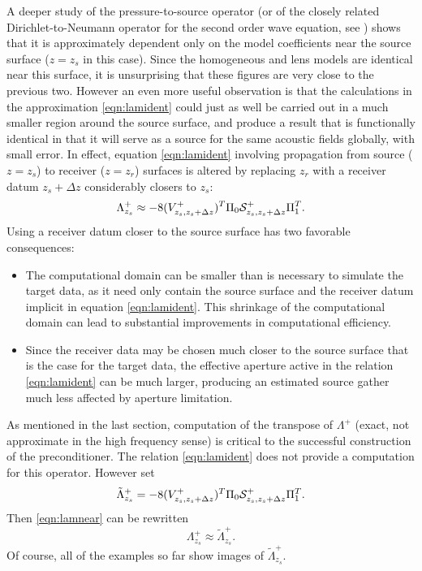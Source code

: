 \documentclass[georeport,12pt]{geophysics}
\begin{document}
A deeper study of the pressure-to-source operator (or of the closely
related Dirichlet-to-Neumann operator for the second order wave
equation, see \cite{StefUhl:05}) shows that it is approximately
dependent only on the model coefficients near the source surface
($z=z_s$ in this case). Since the homogeneous and lens models are
identical near this surface, it is unsurprising that these figures are
very close to the previous two.  However an even more useful
observation is that the calculations in the approximation
\ref{eqn:lamident} could just as well be carried out in a much smaller
region around the source surface, and produce a result that is
functionally identical in that it will serve as a source for the same
acoustic fields globally, with small error. In effect, equation
\ref{eqn:lamident} involving propagation from source ($z=z_s$) to
receiver ($z=z_r$) surfaces is altered by replacing $z_r$ with a
receiver datum $z_s+\Delta z$ considerably closers to $z_s$:
\begin{equation}
  \label{eqn:lamnear}
  \Lambda^+_{z_s} \approx -8(V^{+}_{z_s,z_s+\Delta z})^T\Pi_0 {\cal
    S}^+_{z_s,z_s+\Delta z}\Pi_1^T.
\end{equation}
Using a receiver datum closer to the source surface has two favorable consequences:
\begin{itemize}
\item The computational domain can be smaller than is necessary to
  simulate the target data, as it need only contain the source
  surface and the receiver datum implicit in
  equation \ref{eqn:lamident}. This shrinkage of the computational
  domain can lead to substantial improvements in computational
  efficiency.
\item Since the receiver data may be chosen much closer to the
  source surface that is the case for the target data, the effective
  aperture active in the relation \ref{eqn:lamident} can be much
  larger, producing an estimated source gather much less affected by
  aperture limitation.
\end{itemize}


As mentioned in the last section, computation of the transpose of
$\Lambda^+$ (exact, not approximate in the high frequency sense) is
critical to the successful construction of the preconditioner. The
relation \ref{eqn:lamident} does not provide a computation for this
operator. However set
\begin{equation}
  \label{eqn:lamtilde}
  \tilde{\Lambda}^+_{z_s} = -8(V^{+}_{z_s,z_s+\Delta z})^T\Pi_0 {\cal
    S}^+_{z_s,z_s+\Delta z}\Pi_1^T.
\end{equation}
Then \ref{eqn:lamnear} can be rewritten
\[
  \Lambda^+_{z_s} \approx \tilde{\Lambda}^+_{z_s}.
\]
Of course, all of the examples so far show images of
$\tilde{\Lambda}^+_{z_s}$.
\end{document}

